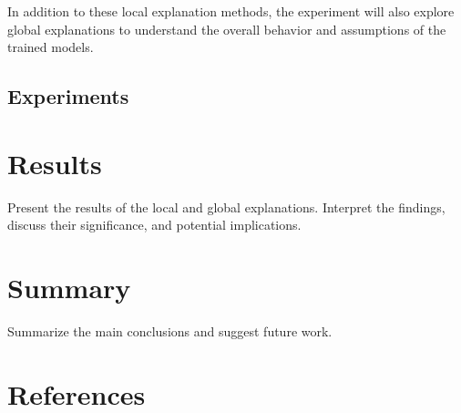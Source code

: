 \documentclass[conference]{IEEEtran}
\begin{document}
    In addition to these local explanation methods, the experiment will also explore global explanations to understand the overall behavior and assumptions of the trained models.

\subsection{Experiments}\label{subsec:experiments}

\section{Results}\label{sec:results}
    Present the results of the local and global explanations.
    Interpret the findings, discuss their significance, and potential implications.

\section{Summary}\label{sec:summary}
    Summarize the main conclusions and suggest future work.

\section{References}\label{sec:references}

    
    
\end{document}
